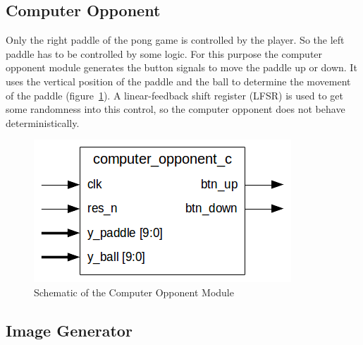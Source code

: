     \subsection{Computer Opponent}
        Only the right paddle of the pong game is controlled by the player. So the left paddle has to be controlled by some logic. For this purpose the computer opponent module generates the button signals to move the paddle up or down. It uses the vertical position of the paddle and the ball to determine the movement of the paddle (figure~\ref{comp_sch}). A linear-feedback shift register (LFSR) is used to get some randomness into this control, so the computer opponent does not behave deterministically.
	    \begin{figure}[h]
		    \centering
		    \includegraphics[scale=0.7]{images/computer_opponent_schematic.png}
		    \caption{Schematic of the Computer Opponent Module}
		    \label{comp_sch}
	    \end{figure}
    \subsection{Image Generator}

